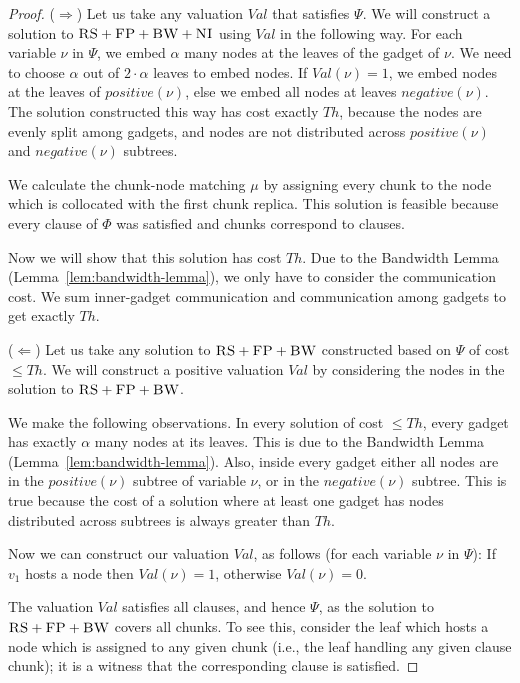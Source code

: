 \documentclass[9pt]{sigcomm-alternate}
\newcommand{\variab}{\nu}
\newcommand{\clauses}{\alpha}
\newcommand{\CC}{\textsc{NI}}
\newcommand{\FP}{\textsc{FP}}
\newcommand{\RS}{\textsc{RS}}
\newcommand{\BW}{\textsc{BW}}
\newcommand{\Formula}{\ensuremath{\Psi}}
\newcommand{\Thr}{\ensuremath{Th}}
\newcommand{\positive}{\ensuremath{positive}}
\newcommand{\negative}{\ensuremath{negative}}
\newcommand{\Val}{\ensuremath{Val}}
\begin{document}
\begin{appendix}
\begin{proof}
($\Rightarrow$) Let us take any valuation $\Val$ that satisfies $\Formula$.
We will construct a solution to $\RS+\FP+\BW+\CC$ using $\Val$ in the following
way.
For each variable $\variab$ in $\Formula$, we embed $\clauses$ many nodes
at the  leaves of the gadget of $\variab$. We need to choose $\clauses$ out of
$2 \cdot \clauses$ leaves to embed nodes. If $\Val(\variab) = 1$, we embed
nodes at the leaves
of $\positive(\variab)$, else we embed all nodes at leaves $\negative(\variab)$.
The solution constructed this way has cost exactly
$\Thr$, because the nodes are evenly split among gadgets, and nodes are not
distributed across $\positive(\variab)$ and $\negative(\variab)$ subtrees.

We calculate the chunk-node matching $\mu$ by assigning every chunk to
the node which is collocated with the first chunk replica. This solution is feasible
because every clause of
$\Phi$ was satisfied and chunks correspond to clauses.

Now we will show that this solution has cost $\Thr$.
Due to the Bandwidth Lemma (Lemma~\ref{lem:bandwidth-lemma}),
we only have to consider the communication cost. We sum inner-gadget communication and communication among gadgets to get exactly $\Thr$.

($\Leftarrow$) Let us take any solution to $\RS+\FP+\BW$ constructed based on $\Formula$ of cost $\leq \Thr$.
We will construct a positive valuation $\Val$ by considering the nodes in
the solution to $\RS+\FP+\BW$.

We make the following observations. In every solution of cost
$\leq \Thr$, every gadget has exactly $\clauses$ many nodes
at its leaves. This is due to the Bandwidth Lemma (Lemma~\ref{lem:bandwidth-lemma}).
Also, inside
every gadget either all nodes are in the $\positive(\variab)$ subtree
of variable $\variab$, or in the $\negative(\variab)$ subtree. This is true
because the cost of a solution where at least one gadget has nodes
distributed across subtrees is
always greater than $\Thr$.

Now we can construct our valuation $\Val$, as follows
(for each variable $\variab$ in $\Formula$):
If $v_1$ hosts a node then $\Val(\variab) = 1$,
otherwise $\Val(\variab) = 0$.

The valuation $\Val$ satisfies all clauses, and hence $\Formula$,
as the solution to $\RS+\FP+\BW$ covers all chunks. To see this,
consider the leaf which
hosts a node which is assigned to any given chunk (i.e.,
the leaf handling any given clause chunk);
it is a witness that the corresponding clause is satisfied.
\end{proof}


\end{appendix}
\end{document}
